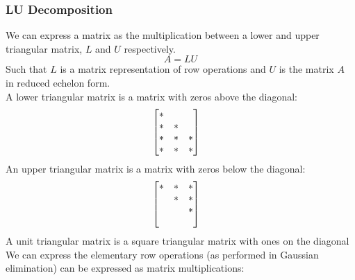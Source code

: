\documentclass[11pt, fleqn]{article}
\begin{document}
\subsubsection{LU Decomposition}
We can express a matrix as the multiplication between a lower and upper triangular matrix, $L$ and $U$ respectively.
$$A=LU$$
Such that $L$ is a matrix representation of row operations and $U$ is the matrix $A$ in reduced echelon form.\\
A lower triangular matrix is a matrix with zeros above the diagonal:
\begin{align*}
    &\matrixx{* & & \\ * & * & \\ * & * & *\\ * & * & *}
\end{align*}
An upper triangular matrix is a matrix with zeros below the diagonal:
\begin{align*}
    &\matrixx{* & * & *\\ & * & *\\ & & *\\ & & }
\end{align*}
A unit triangular matrix is a square triangular matrix with ones on the diagonal\\
We can express the elementary row operations (as performed in Gaussian elimination) can be expressed as matrix multiplications:
\end{document}
